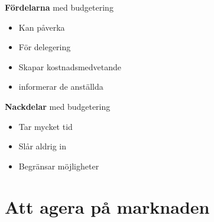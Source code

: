 \documentclass{article}
\begin{document}
\textbf{Fördelarna} med budgetering
\begin{itemize}
    \item Kan påverka
    \item För delegering
    \item Skapar kostnadsmedvetande
    \item informerar de anställda
\end{itemize}

\textbf{Nackdelar} med budgetering
\begin{itemize}
    \item Tar mycket tid
    \item Slår aldrig in 
    \item Begränsar möjligheter
\end{itemize}





\section{Att agera på marknaden}
\end{document}
